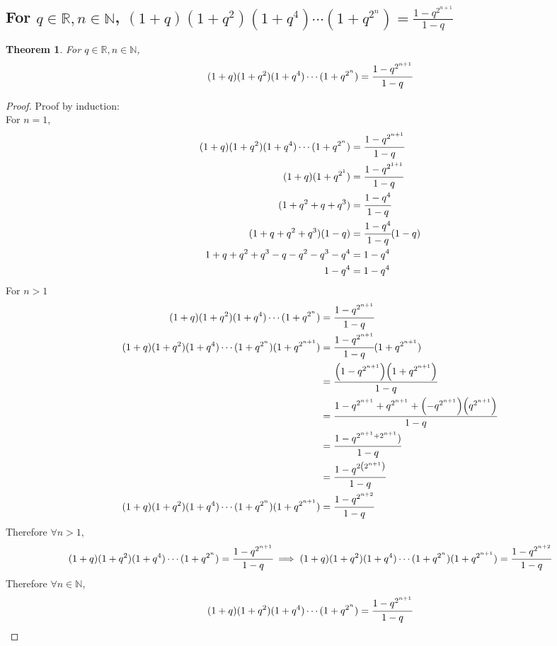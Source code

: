 \documentclass[]{article}
\newcommand{\R}{\mathbb{R}}
\newcommand{\N}{\mathbb{N}}
\newtheorem{theorem}{Theorem}
\begin{document}
\newpage
\subsection{For $q \in \R, n \in \N$,
    $(1+q)(1+q^2)(1+q^4)\cdots(1+q^{2^n}) = \frac{1-q^{2^{n+1}}}{1-q}$
}
\begin{theorem}
    For $q \in \R, n \in \N$,
    $$(1+q)(1+q^2)(1+q^4)\cdots(1+q^{2^n}) = \cfrac{1-q^{2^{n+1}}}{1-q}$$
\end{theorem}
\begin{proof}
    Proof by induction:\\
    For $n=1$,
    \begin{align*}
        (1+q)(1+q^2)(1+q^4)\cdots(1+q^{2^n})
            &= \cfrac{1-q^{2^{n+1}}}{1-q}\\
        (1+q)(1+q^{2^1}) 
            &= \cfrac{1-q^{2^{1+1}}}{1-q}\\
        (1+q^{2} + q + q^{3}) 
            &= \cfrac{1-q^{4}}{1-q}\\
        (1 + q + q^{2} + q^{3}) (1-q)
            &= \cfrac{1-q^{4}}{1-q}(1-q)\\
        1 + q + q^{2} + q^{3} - q - q^2 - q^3 -q^4
            &= 1-q^{4}\\
        1 - q^4
            &= 1-q^{4}\\
    \end{align*}
    For $n>1$
    \begin{align*}
        (1+q)(1+q^2)(1+q^4)\cdots(1+q^{2^n}) &= \cfrac{1-q^{2^{n+1}}}{1-q}\\
        (1+q)(1+q^2)(1+q^4)\cdots(1+q^{2^n})(1+q^{2^{n+1}})
            &= \cfrac{1-q^{2^{n+1}}}{1-q}(1+q^{2^{n+1}})\\
            &= \cfrac{\qty(1-q^{2^{n+1}})\qty(1+q^{2^{n+1}})}{1-q}\\
            &= \cfrac{1-q^{2^{n+1}} + q^{2^{n+1}} + \qty(-q^{2^{n+1}})\qty(q^{2^{n+1}})}{1-q}\\
            &= \cfrac{1 -q^{2^{n+1} + 2^{n+1}})}{1-q}\\
            &= \cfrac{1 -q^{2\qty(2^{n+1})}}{1-q}\\
        (1+q)(1+q^2)(1+q^4)\cdots(1+q^{2^n})(1+q^{2^{n+1}})
            &= \cfrac{1 -q^{2^{n+2}}}{1-q}\\
    \end{align*}
    Therefore $\forall n>1$,
    $$(1+q)(1+q^2)(1+q^4)\cdots(1+q^{2^n}) = \cfrac{1-q^{2^{n+1}}}{1-q}
    \implies (1+q)(1+q^2)(1+q^4)\cdots(1+q^{2^n})(1+q^{2^{n+1}}) = \cfrac{1 -q^{2^{n+2}}}{1-q}
    $$
    Therefore $\forall n \in \N$,
    $$(1+q)(1+q^2)(1+q^4)\cdots(1+q^{2^n}) = \cfrac{1-q^{2^{n+1}}}{1-q}$$
\end{proof}
\end{document}
